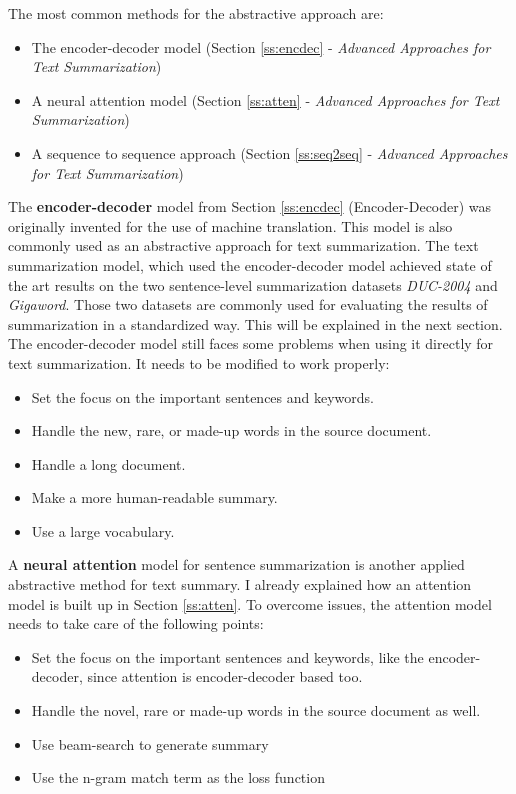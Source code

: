 The most common methods for the abstractive approach are:

\begin{itemize}
	\item The encoder-decoder model (Section \ref{ss:encdec} - \textit{Advanced Approaches for Text Summarization})
	\item A neural attention model (Section \ref{ss:atten} - \textit{Advanced Approaches for Text Summarization})
	\item A sequence to sequence approach (Section \ref{ss:seq2seq} - \textit{Advanced Approaches for Text Summarization})
\end{itemize}

The \textbf{encoder-decoder} model from Section \ref{ss:encdec} (Encoder-Decoder) was originally invented for the use of machine translation. 
This model is also commonly used as an abstractive approach for text summarization. The text summarization model, which used the encoder-decoder model achieved state of the art results on the two sentence-level summarization datasets \textit{DUC-2004} and \textit{Gigaword}. Those two datasets are commonly used for evaluating the results of summarization in a standardized way. This will be explained in the next section.
The encoder-decoder model still faces some problems when using it directly for text summarization. It needs to be modified to work properly:

\begin{itemize}
	\item Set the focus on the important sentences and keywords.
	\item Handle the new, rare, or made-up words in the source document.
	\item Handle a long document.
	\item Make a more human-readable summary.
	\item Use a large vocabulary.
\end{itemize}


A \textbf{neural attention} model for sentence summarization is another applied abstractive method for text summary. I already explained how an attention model is built up in Section \ref{ss:atten}. To overcome issues, the attention model needs to take care of the following points:

\begin{itemize}
	\item Set the focus on the important sentences and keywords, like the encoder-decoder, since attention is encoder-decoder based too.
	\item Handle the novel, rare or made-up words in the source document as well. 
	\item Use beam-search to generate summary
	\item Use the n-gram match term as the loss function
\end{itemize}

